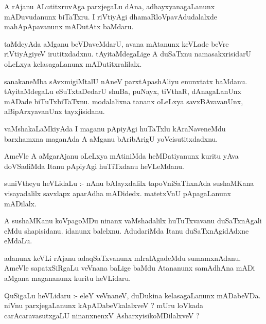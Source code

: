 \documentclass{article}
\begin{document}
\begin{mn}
A rAjanu ALutitxruvAga parxjegaLu dAna,  adhayxyanagaLanunx mADuvudanunx  biTaTxru.  
I riVtiyAgi dhamaRloVpavAdudalalxde mahApApavanunx mADutAtx baMdaru.
\end{mn}

\begin{mn}
taMdeyAda aMganu beVDaveMdarU, avana mAtanunx keVLade beVre riVtiyAgiyeV irutitxdadxnu.  
tAyitaMdegaLige A duSaTxnu namasakxrisidarU oLeLxya kelasagaLanunx mADutitxralilalx.
\end{mn}

\begin{mn}
sanakaneMba sAvxmigiMtalU nAneV parxtApashAliyu enunxtatx baMdanu. tAyitaMdegaLu 
eSuTxtaDedarU  shuBa, puNayx, tiVthaR, dAnagaLanUnx mADade biTuTxbiTaTxnu.  
modalalixna tananx oLeLxya  savxBAvavanUnx, aBipArxyavanUnx  tayxjisidanu.
\end{mn}

\begin{mn}
vaMshakaLaMkiyAda  I maganu pApiyAgi huTaTxlu  kAraNaveneMdu barxhamxna maganAda 
A aMganu bAribArigU yoVcisutitxdadxnu.
\end{mn}

\begin{mn}
AmeVle A aMgarAjanu oLeLxya mAtiniMda heMDatiyanunx kuritu yAva doVSadiMda Itanu pApiyAgi huTiTxdanu heVLeMdanu.
\end{mn}

\begin{mn}
suniVtheyu heVLidaLu :- nAnu bAlayxdalilx  tapoVniSaThxnAda sushaMKana visayadalilx 
savxlapx aparAdha mADidedx.  matetxVnU pApagaLanunx mADilalx.
\end{mn}

\begin{mn}
A sushaMKanu koVpagoMDu ninanx  vaMshadalilx huTuTxvavanu duSaTxnAgali eMdu shapisidanu.  
idanunx balelxnu.  AdudariMda Itanu duSaTxnAgidAdxne eMdaLu.
\end{mn}

\begin{mn}
adanunx keVLi rAjanu adaqSaTxvanunx mIralAgadeMdu sumamxnAdanu.  AmeVle sapatxSiRgaLu 
veVnana  baLige baMdu Atananunx samAdhAna mADi aMgana magananunx kuritu heVLidaru.
\end{mn}

\begin{mn}
QuSigaLu heVLidaru :- eleY veVnaneV, duDukina kelasagaLanunx mADabeVDa.  niVnu parxjegaLanunx  
kApADabeVkalalxveV ?  mUru loVkada carAcaravasutxgaLU ninanxnenxV AsharxyisikoMDilalxveV ?
\end{mn}
\end{document}
